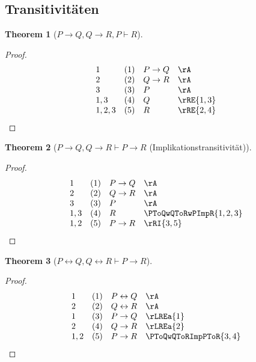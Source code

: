 \documentclass{book}
\theoremstyle{plain}
\newtheorem{theorem}{Theorem}
\theoremstyle{remark}
\theoremstyle{definition}
\begin{document}
\subsection{Transitivitäten}

\label{PToQwQToRwPImpR}
\begin{theorem}[\(P\rightarrow Q, Q\rightarrow R, P\vdash R\)]
\end{theorem}
\begin{proof}
	\[
	\begin{array}{llll}
		1 & (1) & P \rightarrow Q & \rA \\
		2 & (2) & Q \rightarrow R & \rA \\
		3 & (3) & P & \rA \\
		1,3 & (4) & Q & \rRE{1,3} \\
		1,2,3 & (5) & R & \rRE{2,4} \\
	\end{array}
	\]
\end{proof}

\label{PToQwQToRImpPToR}
\begin{theorem}[\(P\rightarrow Q, Q\rightarrow R\vdash P \rightarrow R\) (Implikationstransitivität)]
\end{theorem}
\begin{proof}
	\[
	\begin{array}{llll}
		1 & (1) & P \rightarrow Q & \rA \\
		2 & (2) & Q \rightarrow R & \rA \\
		3 & (3) & P & \rA \\
		1,3 & (4) & R & \PToQwQToRwPImpR{1,2,3} \\
		1,2 & (5) & P \rightarrow R & \rRI{3,5} \\
	\end{array}
	\]
\end{proof}

\label{PLrQwQLrRImpPToR}
\begin{theorem}[\(P \leftrightarrow Q, Q \leftrightarrow R \vdash P \rightarrow R\)]
\end{theorem}
\begin{proof}
	\[
	\begin{array}{llll}
		1 & (1) & P \leftrightarrow Q & \rA \\
		2 & (2) & Q \leftrightarrow R & \rA \\
		1 & (3) & P \rightarrow Q & \rLREa{1} \\
		2 & (4) & Q \rightarrow R & \rLREa{2} \\
		1,2 & (5) & P \rightarrow R & \PToQwQToRImpPToR{3,4} \\
	\end{array}
	\]
\end{proof}
\end{document}
